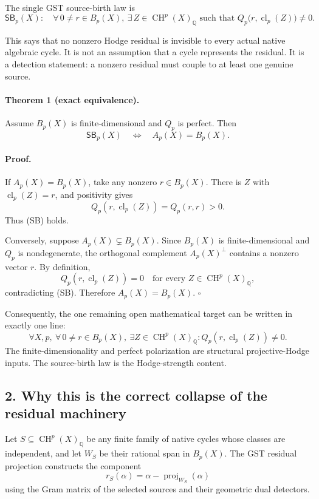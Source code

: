 The single GST source-birth law is
\[
\boxed{
\mathsf{SB}_p(X):
\quad
\forall\,0\ne r\in B_p(X),\
\exists\,Z\in\operatorname{CH}^p(X)_{\mathbb Q}
\text{ such that }
Q_p\bigl(r,\operatorname{cl}_p(Z)\bigr)\ne0.
}
\tag{SB}
\]

This says that no nonzero Hodge residual is invisible to every actual native algebraic cycle. It is not an assumption that a cycle represents the residual. It is a detection statement: a nonzero residual must couple to at least one genuine source.

\paragraph{Theorem 1 (exact equivalence).}
Assume \(B_p(X)\) is finite-dimensional and \(Q_p\) is perfect. Then
\[
\mathsf{SB}_p(X)
\quad\Longleftrightarrow\quad
A_p(X)=B_p(X).
\]

\paragraph{Proof.}
If \(A_p(X)=B_p(X)\), take any nonzero \(r\in B_p(X)\). There is \(Z\) with \(\operatorname{cl}_p(Z)=r\), and positivity gives
\[
Q_p(r,\operatorname{cl}_p(Z))=Q_p(r,r)>0.
\]
Thus (SB) holds.

Conversely, suppose \(A_p(X)\subsetneq B_p(X)\). Since \(B_p(X)\) is finite-dimensional and \(Q_p\) is nondegenerate, the orthogonal complement \(A_p(X)^\perp\) contains a nonzero vector \(r\). By definition,
\[
Q_p(r,\operatorname{cl}_p(Z))=0
\quad\text{for every }Z\in\operatorname{CH}^p(X)_{\mathbb Q},
\]
contradicting (SB). Therefore \(A_p(X)=B_p(X)\). \(\square\)

Consequently, the one remaining open mathematical target can be written in exactly one line:
\[
\boxed{
\forall X,p,\ \forall\,0\ne r\in B_p(X),\
\exists Z\in\operatorname{CH}^p(X)_{\mathbb Q}:
Q_p(r,\operatorname{cl}_p(Z))\ne0.
}
\tag{GST-SB}
\]
The finite-dimensionality and perfect polarization are structural projective-Hodge inputs. The source-birth law is the Hodge-strength content.

\subsection*{2. Why this is the correct collapse of the residual machinery}

Let \(S\subseteq\operatorname{CH}^p(X)_{\mathbb Q}\) be any finite family of native cycles whose classes are independent, and let \(W_S\) be their rational span in \(B_p(X)\). The GST residual projection constructs the component
\[
r_S(\alpha)=\alpha-\operatorname{proj}_{W_S}(\alpha)
\]
using the Gram matrix of the selected sources and their geometric dual detectors.

